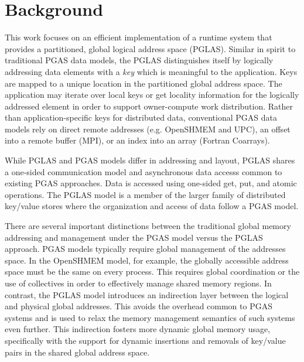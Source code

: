 \section{Background}

This work focuses on an efficient implementation of a runtime system that
provides a partitioned, global logical address space (PGLAS). Similar in spirit
to traditional PGAS data models, the PGLAS distinguishes itself by logically
addressing data elements with a {\em key} which is meaningful to the
application. Keys are mapped to a unique location in the partitioned global
address space. The application may iterate over local keys or get locality
information for the logically addressed element in order to support
owner-compute work distribution. Rather than application-specific keys for distributed
data, conventional PGAS data models rely on direct remote addresses (e.g. OpenSHMEM
and UPC), an offset into a remote buffer (MPI), or an index into an array
(Fortran Coarrays). 

While PGLAS and PGAS models differ in addressing and layout, PGLAS shares a
one-sided communication model and asynchronous data accesss common to existing
PGAS approaches. Data is accessed using one-sided get, put, and atomic operations.
The PGLAS model is a member of the larger family of distributed key/value stores where
the organization and access of data follow a PGAS model.


There are several important distinctions between the traditional global memory
addressing and management under the PGAS model versus the PGLAS approach. PGAS
models typically require global management of the addresses space. In the
OpenSHMEM model, for example, the globally accessible address space must be the
same on every process. This requires global coordination or the use of
collectives in order to effectively manage shared memory regions. In contrast,
the PGLAS model introduces an indirection layer between the logical and
physical global addresses. This avoids the overhead common to PGAS systems and
is used to relax the memory management semantics of such systems even further.
This indirection fosters more dynamic global memory usage, specifically with
the support for dynamic insertions and removals of key/value pairs in the
shared global address space. 

